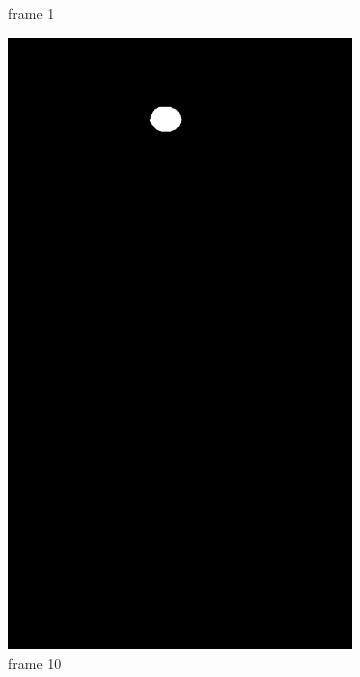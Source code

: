 \documentclass[12pt,a4paper]{article}
\begin{document}
\begin{figure}[htb]
\begin{subfigure}[h!]{0.3\textwidth}
		\caption{frame 1}
	\end{subfigure}
	\begin{subfigure}[h!]{0.3\textwidth}
		\centering
		\includegraphics[width=\textwidth]{7296/9.png}
		\caption{frame 10}
	\end{subfigure}
	\begin{subfigure}[h!]{0.3\textwidth}
		\centering

\end{subfigure}
\end{figure}
\end{document}
